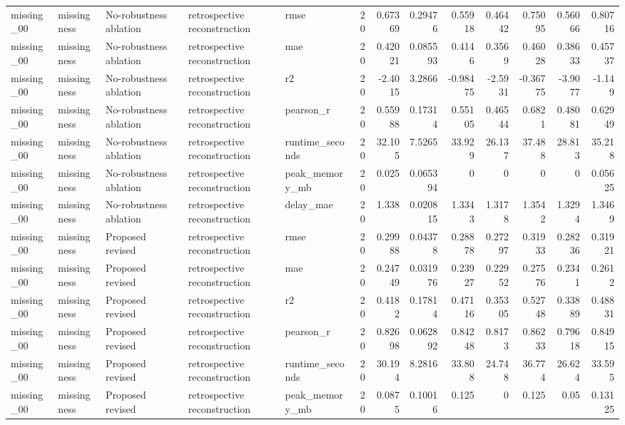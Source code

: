 \begin{table}[!htbp]
{{\begin{tabular}{lllllrrrrrrrr}
missing_00 & missingness & No-robustness ablation & retrospective reconstruction & rmse & 20 & 0.67369 & 0.29476 & 0.55918 & 0.46442 & 0.75095 & 0.56066 & 0.80716 \\
missing_00 & missingness & No-robustness ablation & retrospective reconstruction & mae & 20 & 0.42021 & 0.085593 & 0.4146 & 0.3569 & 0.46028 & 0.38633 & 0.45737 \\
missing_00 & missingness & No-robustness ablation & retrospective reconstruction & r2 & 20 & -2.4015 & 3.2866 & -0.98475 & -2.5931 & -0.36775 & -3.9077 & -1.149 \\
missing_00 & missingness & No-robustness ablation & retrospective reconstruction & pearson_r & 20 & 0.55988 & 0.17314 & 0.55105 & 0.46544 & 0.6821 & 0.48081 & 0.62949 \\
missing_00 & missingness & No-robustness ablation & retrospective reconstruction & runtime_seconds & 20 & 32.105 & 7.5265 & 33.929 & 26.137 & 37.488 & 28.813 & 35.218 \\
missing_00 & missingness & No-robustness ablation & retrospective reconstruction & peak_memory_mb & 20 & 0.025 & 0.065394 & 0 & 0 & 0 & 0 & 0.05625 \\
missing_00 & missingness & No-robustness ablation & retrospective reconstruction & delay_mae & 20 & 1.338 & 0.020815 & 1.3343 & 1.3178 & 1.3542 & 1.3294 & 1.3469 \\
missing_00 & missingness & Proposed revised & retrospective reconstruction & rmse & 20 & 0.29988 & 0.04378 & 0.28878 & 0.27297 & 0.31933 & 0.28236 & 0.31921 \\
missing_00 & missingness & Proposed revised & retrospective reconstruction & mae & 20 & 0.24749 & 0.031976 & 0.23927 & 0.22952 & 0.27576 & 0.2341 & 0.2612 \\
missing_00 & missingness & Proposed revised & retrospective reconstruction & r2 & 20 & 0.4182 & 0.17814 & 0.47116 & 0.35305 & 0.52748 & 0.33889 & 0.48831 \\
missing_00 & missingness & Proposed revised & retrospective reconstruction & pearson_r & 20 & 0.82698 & 0.062892 & 0.84248 & 0.8173 & 0.86233 & 0.79618 & 0.84915 \\
missing_00 & missingness & Proposed revised & retrospective reconstruction & runtime_seconds & 20 & 30.194 & 8.2816 & 33.808 & 24.748 & 36.774 & 26.624 & 33.595 \\
missing_00 & missingness & Proposed revised & retrospective reconstruction & peak_memory_mb & 20 & 0.0875 & 0.10016 & 0.125 & 0 & 0.125 & 0.05 & 0.13125 \\

\end{tabular}}}
\end{table}
